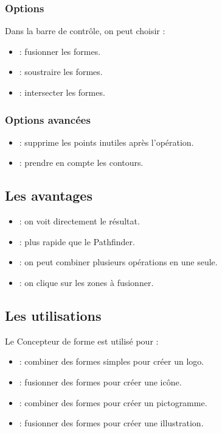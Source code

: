 \subsubsection{Options}

Dans la barre de contrôle, on peut choisir :

\begin{itemize}
    \item {} : fusionner les formes.
    \item {} : soustraire les formes.
    \item {} : intersecter les formes.
\end{itemize}

\subsubsection{Options avancées}

\begin{itemize}
    \item {} : supprime les points inutiles après l'opération.
    \item {} : prendre en compte les contours.
\end{itemize}

\subsection{Les avantages}

\begin{itemize}
    \item {} : on voit directement le résultat.
    \item {} : plus rapide que le Pathfinder.
    \item {} : on peut combiner plusieurs opérations en une seule.
    \item {} : on clique sur les zones à fusionner.
\end{itemize}

\subsection{Les utilisations}

Le Concepteur de forme est utilisé pour :

\begin{itemize}
    \item {} : combiner des formes simples pour créer un logo.
    \item {} : fusionner des formes pour créer une icône.
    \item {} : combiner des formes pour créer un pictogramme.
    \item {} : fusionner des formes pour créer une illustration.
\end{itemize}

